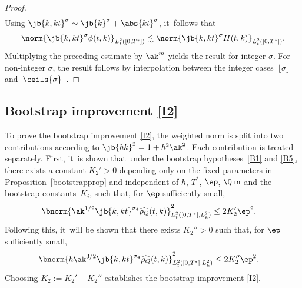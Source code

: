 \begin{proof}
\begin{align*}
\end{align*}
Using $\jb{k,kt}^\sigma\sim \jb{k}^\sigma+\abs{kt}^\sigma$, it~follows that
\begin{align*}
\norm{\jb{k,kt}^\sigma \phi(t,k)}_{L^2_t([0,T^*])}\lesssim\norm{\jb{k,kt}^\sigma H(t,k)}_{L^2_t([0,T^*])}.
\end{align*} Multiplying the preceding estimate by $\ak^m$ yields the result for integer $\sigma$. For non-integer $\sigma$, the result follows by interpolation between the integer cases~$\lfloor\sigma\rfloor$ and~$\ceils{\sigma}$~\cite{SteinWeiss1958}.
\end{proof}

\subsection{Bootstrap improvement \eqref{I2}}\label{sectionb2}
To prove the bootstrap improvement \eqref{I2}, the weighted norm is split into two contributions according to $\jb{\hbar k}^2 = 1 + \hbar^2 \ak^2$. Each contribution is treated separately. First, it~is shown that under the bootstrap hypotheses~\eqref{B1} and \eqref{B5}, there exists a constant $K_2'>0$ depending only on the fixed parameters in Proposition~\ref{bootstrapprop} and independent of $\hbar$, $T^*$, $\ep$, $\Qin$ and the bootstrap constants~$K_i$, such that, for $\ep$ sufficiently small,
\begin{align}
\bnorm{\ak^{1/2}\jb{k,kt}^{\sigma_4}\widehat{\rho_Q}(t,k)}_{L^2_t([0,T^*],L^2_k)}^2&\leq 2K_2'\ep^2.\label{B2original}
\end{align} Following this, it~will be shown that there exists $K_2''>0$ such that, for $\ep$ sufficiently small,
\begin{align}
\bnorm{\hbar\ak^{3/2}\jb{k,kt}^{\sigma_4}\widehat{\rho_Q}(t,k)}_{L^2_{t}([0,T^*],L^2_k)}^2&\leq 2K_2''\ep^2.\label{B2new}
\end{align}Choosing $K_2:=K_2'+K_2''$ establishes the bootstrap improvement \eqref{I2}.

